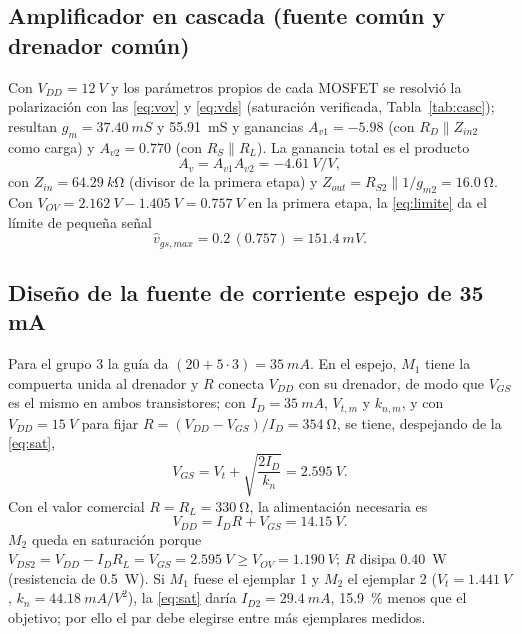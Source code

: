 \documentclass[conference]{IEEEtran}
\newcommand{\gm}{g_m}
\newcommand{\kn}{k_n}
\newcommand{\Vov}{V_{OV}}
\newcommand{\Vtm}{V_{t,m}}
\newcommand{\knm}{k_{n,m}}
\begin{document}
\subsection{Amplificador en cascada (fuente común y drenador común)}
Con $V_{DD}=\SI{12}{V}$ y los parámetros propios de cada MOSFET se resolvió la polarización con las \eqref{eq:vov} y \eqref{eq:vds} (saturación verificada, Tabla~\ref{tab:casc}); resultan $\gm=\SI{37.40}{mS}$ y \SI{55.91}{mS} y ganancias $A_{v1}=-5.98$ (con $R_D\parallel Z_{in2}$ como carga) y $A_{v2}=0.770$ (con $R_S\parallel R_L$). La ganancia total es el producto
\begin{equation}
A_v=A_{v1}A_{v2}=\SI{-4.61}{V/V},
\label{eq:Av_casc}
\end{equation}
con $Z_{in}=\SI{64.29}{k\ohm}$ (divisor de la primera etapa) y $Z_{out}=R_{S2}\parallel 1/g_{m2}=\SI{16.0}{\ohm}$. Con $\Vov=\SI{2.162}{V}-\SI{1.405}{V}=\SI{0.757}{V}$ en la primera etapa, la \eqref{eq:limite} da el límite de pequeña señal
\begin{equation}
\hat v_{gs,max}=0.2\,(0.757)=\SI{151.4}{mV}.
\label{eq:vgs_casc}
\end{equation}

\subsection{Diseño de la fuente de corriente espejo de 35 mA}
Para el grupo 3 la guía da $(20+5\cdot3)=\SI{35}{mA}$. En el espejo, $M_1$ tiene la compuerta unida al drenador y $R$ conecta $V_{DD}$ con su drenador, de modo que $V_{GS}$ es el mismo en ambos transistores; con $I_D=\SI{35}{mA}$, $\Vtm$ y $\knm$, y con $V_{DD}=\SI{15}{V}$ para fijar $R=(V_{DD}-V_{GS})/I_D=\SI{354}{\ohm}$, se tiene, despejando de la \eqref{eq:sat},
\begin{equation}
V_{GS}=V_t+\sqrt{\frac{2I_D}{\kn}}=\SI{2.595}{V}.
\label{eq:vgs_esp}
\end{equation}
Con el valor comercial $R=R_L=\SI{330}{\ohm}$, la alimentación necesaria es
\begin{equation}
V_{DD}=I_DR+V_{GS}=\SI{14.15}{V}.
\label{eq:vdd_esp}
\end{equation}
$M_2$ queda en saturación porque $V_{DS2}=V_{DD}-I_DR_L=V_{GS}=\SI{2.595}{V}\ge\Vov=\SI{1.190}{V}$; $R$ disipa \SI{0.40}{W} (resistencia de \SI{0.5}{W}). Si $M_1$ fuese el ejemplar 1 y $M_2$ el ejemplar 2 ($V_t=\SI{1.441}{V}$, $\kn=\SI{44.18}{mA/V^2}$), la \eqref{eq:sat} daría $I_{D2}=\SI{29.4}{mA}$, \SI{15.9}{\percent} menos que el objetivo; por ello el par debe elegirse entre más ejemplares medidos.
\end{document}
